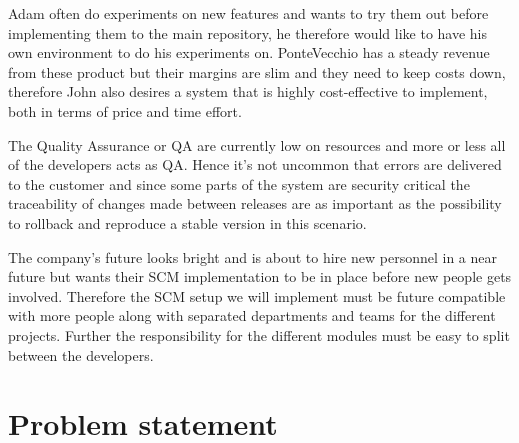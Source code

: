 \documentclass[10pt]{article}
\begin{document}
\noindent Adam often do experiments on new features and wants to try them out before implementing them to the main repository, he therefore would like to have his own environment to do his experiments on. PonteVecchio has a steady revenue from these product but their margins are slim and they need to keep costs down, therefore John also desires a system that is highly cost-effective to implement, both in terms of price and time effort. 

\noindent The Quality Assurance or QA are currently low on resources and more or less all of the developers acts as QA. Hence it’s not uncommon that errors are delivered to the customer and since some parts of the system are security critical the traceability of changes made between releases are as important as the possibility to rollback and reproduce a stable version in this scenario.

\noindent The company's future looks bright and is about to hire new personnel in a near future but wants their SCM implementation to be in place before new people gets involved. Therefore the SCM setup we will implement must be future compatible with more people along with separated departments and teams for the different projects. Further the responsibility for the different modules must be easy to split between the developers.

\section{Problem statement}
\end{document}
